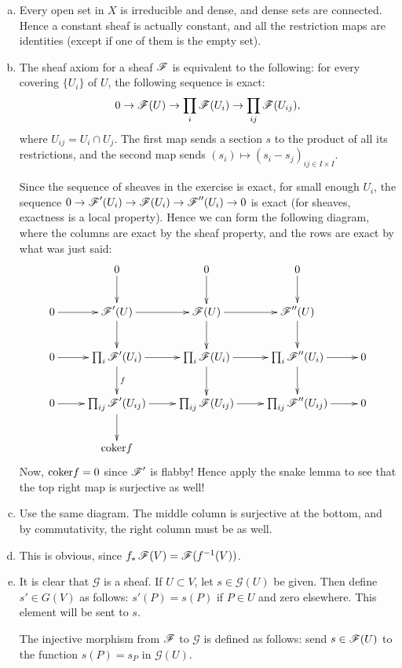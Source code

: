 \documentclass[11pt, english]{article}
\begin{document}
\begin{sol}
\begin{enumerate}[a)]
\item Every open set in $X$ is irreducible and dense, and dense sets are connected. Hence a constant sheaf is actually constant, and all the restriction maps are identities (except if one of them is the empty set).
\item The sheaf axiom for a sheaf $\operatorname{\mathscr{F}}$ is equivalent to the following: for every covering $\{U_i \}$ of $U$, the following sequence is exact:
$$
0 \to \operatorname{\mathscr{F}}(U) \to \prod_i \operatorname{\mathscr{F}}(U_i) \to \prod_{ij} \operatorname{\mathscr{F}}(U_{ij}),
$$
where $U_{ij}= U_i \cap U_j$. The first map sends a section $s$ to the product of all its restrictions, and the second map sends $(s_i) \mapsto (s_i-s_j)_{ij \in I \times I}$.

Since the sequence of sheaves in the exercise is exact, for small enough $U_i$, the sequence $0 \to \operatorname{\mathscr{F}}'(U_i) \to \operatorname{\mathscr{F}}(U_i) \to \operatorname{\mathscr{F}}''(U_i) \to 0$ is exact (for sheaves, exactness is a local property). Hence we can form the following diagram, where the columns are exact by the sheaf property, and the rows are exact by what was just said:
\[
\xymatrix{
 & 0\ar[d] & 0 \ar[d] & 0 \ar[d] \\
 0 \ar[r] & \FF'(U) \ar[r]\ar[d] & \FF(U) \ar[r]\ar[d] & \FF''(U)\ar[d] \\
 0 \ar[r] & \prod_i \FF'(U_i) \ar[r]\ar[d]^f & \prod_i \FF(U_i) \ar[r]\ar[d] & \prod_i\FF''(U_i) \ar[r]\ar[d] & 0  \\
 0 \ar[r] &\prod_{ij} \FF'(U_{ij}) \ar[r]\ar[d] & \prod_{ij} \FF(U_{ij}) \ar[r] & \prod_{ij}\FF''(U_{ij}) \ar[r] & 0 \\
 & \coker f
}
\]
Now, $\text{coker} f=0$ since $\operatorname{\mathscr{F}}'$ is flabby! Hence apply the snake lemma to see that the top right map is surjective as well!
\item Use the same diagram. The middle column is surjective at the bottom, and by commutativity, the right column must be as well.
\item This is obvious, since $f_\ast \operatorname{\mathscr{F}}(V) = \operatorname{\mathscr{F}}(f^{-1}(V))$.
\item It is clear that $\mathscr G$ is a sheaf. If $U \subset V$, let $s \in \mathscr G(U)$ be given. Then define $s' \in G(V)$ as follows: $s'(P)=s(P)$ if $P \in U$ and zero elsewhere. This element will be sent to $s$.

The injective morphism from $\operatorname{\mathscr{F}}$ to $\mathscr G$ is defined as follows: send $s \in \operatorname{\mathscr{F}}(U)$ to the function $s(P)=s_P$ in $\mathscr G(U)$.
\end{enumerate}
\end{sol}
\end{document}
